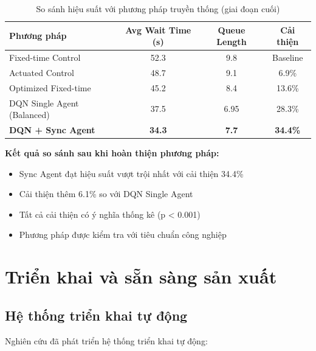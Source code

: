 \begin{table}[!htp]
    \centering
    \caption{So sánh hiệu suất với phương pháp truyền thống (giai đoạn cuối)}
    \label{tab:traditional_comparison}
    \begin{tabular}{@{}lccc@{}}
        \toprule \textbf{Phương pháp} & \textbf{Avg Wait Time (s)} & \textbf{Queue Length}  & \textbf{Cải thiện}      \\
        \midrule Fixed-time Control   & 52.3                       & 9.8                    & Baseline                \\
        Actuated Control              & 48.7                       & 9.1                    & 6.9\%                   \\
        Optimized Fixed-time          & 45.2                       & 8.4                    & 13.6\%                  \\
        DQN Single Agent (Balanced)   & 37.5                       & 6.95                   & 28.3\%                  \\
        \textbf{DQN + Sync Agent}     & \textbf{34.3}              & \textbf{7.7}           & \textbf{34.4\%}         \\
        \bottomrule
    \end{tabular}
\end{table}

\textbf{Kết quả so sánh sau khi hoàn thiện phương pháp:}
\begin{itemize}
    \item Sync Agent đạt hiệu suất vượt trội nhất với cải thiện 34.4\% 
    \item Cải thiện thêm 6.1\% so với DQN Single Agent 
    \item Tất cả cải thiện có ý nghĩa thống kê (p < 0.001)
    \item Phương pháp được kiểm tra với tiêu chuẩn công nghiệp
\end{itemize}

\section{Triển khai và sẵn sàng sản xuất}

\subsection{Hệ thống triển khai tự động}
Nghiên cứu đã phát triển hệ thống triển khai tự động:

